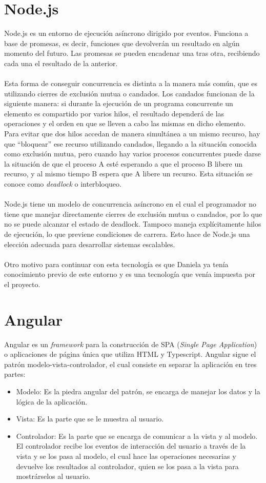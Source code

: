 \documentclass[11pt]{book}
\begin{document}
	\section{Node.js} 
	Node.js \cite{node} es un entorno de ejecución asíncrono dirigido por eventos. Funciona a base de promesas, es decir, funciones que devolverán un resultado en algún momento del futuro. Las promesas se pueden encadenar una tras otra, recibiendo cada una el resultado de la anterior.\\\\
	Esta forma de conseguir concurrencia es distinta a la manera más común, que es utilizando cierres de exclusión mutua o candados. Los candados funcionan de la siguiente manera: si durante la ejecución de un programa concurrente un elemento es compartido por varios hilos, el resultado dependerá de las operaciones y el orden en que se lleven a cabo las mismas en dicho elemento. Para evitar que dos hilos accedan de manera simultánea a un mismo recurso, hay que ``bloquear'' ese recurso utilizando candados, llegando a la situación conocida como exclusión mutua, pero cuando hay varios procesos concurrentes puede darse la situación de que el proceso A esté esperando a que el proceso B libere un recurso, y al mismo tiempo B espera que A libere un recurso. Esta situación se conoce como \emph{deadlock} o interbloqueo.\\\\
	Node.js tiene un modelo de concurrencia asíncrono en el cual el programador no tiene que manejar directamente cierres de exclusión mutua o candados, por lo que no se puede alcanzar el estado de deadlock. Tampoco maneja explícitamente hilos de ejecución, lo que previene condiciones de carrera. Esto hace de Node.js una elección adecuada para desarrollar sistemas escalables.\\\\
	Otro motivo para continuar con esta tecnología es que Daniela ya tenía conocimiento previo de este entorno y es una tecnología que venía impuesta por el proyecto.
	
	\section{Angular}
	Angular \cite{angular} es un \emph{framework} para la construcción de SPA (\textit{Single Page Application}) o aplicaciones de página única que utiliza HTML y Typescript. Angular sigue el patrón modelo-vista-controlador, el cual consiste en separar la aplicación en tres partes:
	\begin{itemize}
		\item Modelo: Es la piedra angular del patrón, se encarga de manejar los datos y la lógica de la aplicación.
		\item Vista: Es la parte que se le muestra al usuario.
		\item Controlador: Es la parte que se encarga de comunicar a la vista y al modelo. El controlador recibe los eventos de interacción del usuario a través de la vista y se los pasa al modelo, el cual hace las operaciones necesarias y devuelve los resultados al controlador, quien se los pasa a la vista para mostrárselos al usuario.
	\end{itemize}
	
\end{document}
